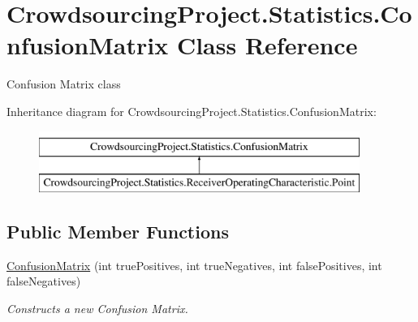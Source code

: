 \hypertarget{class_crowdsourcing_project_1_1_statistics_1_1_confusion_matrix}{}\section{Crowdsourcing\+Project.\+Statistics.\+Confusion\+Matrix Class Reference}
\label{class_crowdsourcing_project_1_1_statistics_1_1_confusion_matrix}


Confusion Matrix class  


Inheritance diagram for Crowdsourcing\+Project.\+Statistics.\+Confusion\+Matrix\+:\begin{figure}[H]
\begin{center}
\leavevmode
\includegraphics[height=2.000000cm]{class_crowdsourcing_project_1_1_statistics_1_1_confusion_matrix}
\end{center}
\end{figure}
\subsection*{Public Member Functions}
\begin{DoxyCompactItemize}
\item 
\hyperlink{class_crowdsourcing_project_1_1_statistics_1_1_confusion_matrix_add656d4ea4928b25ef16b0a35cba6f90}{Confusion\+Matrix} (int true\+Positives, int true\+Negatives, int false\+Positives, int false\+Negatives)
\begin{DoxyCompactList}\small\item\em Constructs a new Confusion Matrix. \end{DoxyCompactList}\end{DoxyCompactItemize}
